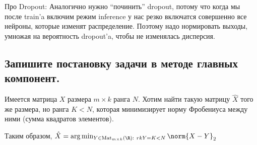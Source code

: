 Про Dropout: Аналогично нужно “починить” dropout, потому что когда мы после train’a включим режим inference у нас резко включатся совершенно все нейроны, которые изменят распределение. Поэтому надо нормировать выходы, умножая на вероятность dropout’a, чтобы не изменялась дисперсия.








\subsection{Запишите постановку задачи в методе главных компонент.}

Имеется матрица $X$ размера $m \times k$ ранга $N$. Хотим найти такую матрицу $\hat{X}$ того же размера, но ранга $K < N$, которая минимизирует норму Фробениуса между ними (сумма квадратов элементов).

Таким образом, $\hat{X} = \arg\min_{Y \in \text{Mat}_{m \times k}(\R): \ rk Y = K < N} \norm{X - Y}_2$
